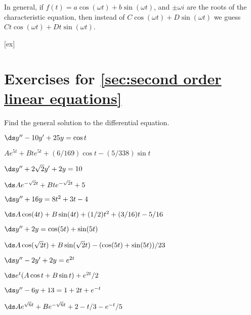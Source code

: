 In general, if $f(t)=a\cos(\omega t)+b\sin(\omega t)$, and $\pm \omega
i$ are the roots of the characteristic equation, then instead of 
$C\cos(\omega t)+D\sin(\omega t)$ we guess $Ct\cos(\omega t)+Dt\sin(\omega t)$.


[ex]
\section*{Exercises for \ref{sec:second order linear equations}}

\begin{enumialphparenastyle}

Find the general solution to the differential equation.

\begin{ex}
 $\ds y'' -10y'+25y=\cos t$
\begin{sol}
 $Ae^{5t}+Bte^{5t}+(6/169)\cos t-(5/338)\sin t$
\end{sol}
\end{ex}


\begin{ex}
 $\ds y''+2\sqrt2y'+2y=10$
\begin{sol}
 $\ds Ae^{-\sqrt2t}+Bte^{-\sqrt2t}+5$
\end{sol}
\end{ex}


\begin{ex}
 $\ds y''+16y=8t^2+3t-4$
\begin{sol}
 $\ds A\cos(4t)+B\sin(4t)+ (1/2)t^2+(3/16)t-5/16$
\end{sol}
\end{ex}


\begin{ex}
 $\ds y''+2y=\cos(5t)+\sin(5t)$
\begin{sol}
 $\ds A\cos(\sqrt2t)+B\sin(\sqrt2t)-(\cos(5t)+\sin(5t))/23$
\end{sol}
\end{ex}


\begin{ex}
 $\ds y''-2y'+2y=e^{2t}$
\begin{sol}
 $\ds e^{t}(A\cos t+B\sin t)+e^{2t}/2$
\end{sol}
\end{ex}


\begin{ex}
 $\ds y''-6y+13=1+2t+e^{-t}$
\begin{sol}
 $\ds Ae^{\sqrt6t}+Be^{-\sqrt6t}+2-t/3-e^{-t}/5$
\end{sol}
\end{ex}



\end{enumialphparenastyle}
